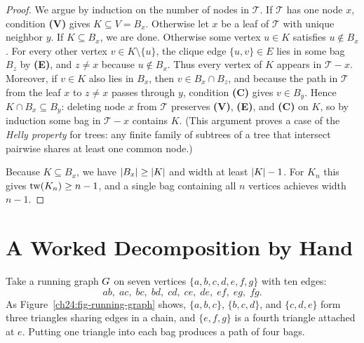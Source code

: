 \begin{proof}
We argue by induction on the number of nodes in $\mathcal{T}$. If $\mathcal{T}$ has one node $x$, condition \textbf{(V)} gives $K\subseteq V = B_x$. Otherwise let $x$ be a leaf of $\mathcal{T}$ with unique neighbor $y$. If $K\subseteq B_x$, we are done. Otherwise some vertex $u\in K$ satisfies $u\notin B_x$. For every other vertex $v\in K\setminus\{u\}$, the clique edge $\{u,v\}\in E$ lies in some bag $B_z$ by \textbf{(E)}, and $z\ne x$ because $u\notin B_x$. Thus every vertex of $K$ appears in $\mathcal{T}-x$. Moreover, if $v\in K$ also lies in $B_x$, then $v\in B_x\cap B_z$, and because the path in $\mathcal{T}$ from the leaf $x$ to $z\ne x$ passes through $y$, condition \textbf{(C)} gives $v\in B_y$. Hence $K\cap B_x\subseteq B_y$: deleting node $x$ from $\mathcal{T}$ preserves \textbf{(V)}, \textbf{(E)}, and \textbf{(C)} on $K$, so by induction some bag in $\mathcal{T}-x$ contains $K$. (This argument proves a case of the \emph{Helly property} for trees: any finite family of subtrees of a tree that intersect pairwise shares at least one common node.)

Because $K\subseteq B_x$, we have $\lvert B_x\rvert\ge\lvert K\rvert$ and width at least $\lvert K\rvert-1$. For $K_n$ this gives $\operatorname{tw}(K_n)\ge n-1$, and a single bag containing all $n$ vertices achieves width $n-1$.
\end{proof}

\section{A Worked Decomposition by Hand}
\label{ch24:worked-decomp}

Take a running graph $G$ on seven vertices $\{a,b,c,d,e,f,g\}$ with ten edges:
\[
  ab,\; ac,\; bc,\; bd,\; cd,\; ce,\; de,\; ef,\; eg,\; fg.
\]
As Figure~\ref{ch24:fig-running-graph} shows, $\{a,b,c\}$, $\{b,c,d\}$, and
$\{c,d,e\}$ form three triangles sharing edges in a chain, and $\{e,f,g\}$ is a
fourth triangle attached at $e$. Putting one triangle into each bag produces a
path of four bags.


